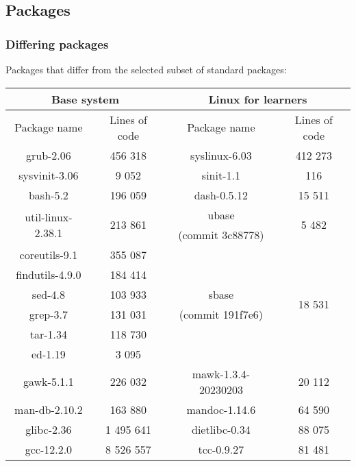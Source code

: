 \subsection{Packages}\label{Packages}

\subsubsection{Differing packages}

Packages that differ from the selected subset of standard packages:

\begin{center}
    \begin{tabular}{|c|c||c|c|}
        \hline
        \multicolumn{2}{|c||}{Base system} & \multicolumn{2}{|c|}{Linux for learners} \\
        \hline
        \hline
        Package name & Lines of code & Package name & Lines of code \\
        \hline
        \hline
        grub-2.06 & 456 318 & syslinux-6.03 & 412 273 \\
        \hline
        sysvinit-3.06 & 9 052 & sinit-1.1 & 116 \\
        \hline
        bash-5.2 & 196 059 & dash-0.5.12 & 15 511 \\
        \hline
        \multirow{2}{*}{util-linux-2.38.1} & \multirow{2}{*}{213 861} & ubase & \multirow{2}{*}{5 482} \\
        & & (commit 3c88778) & \\
        \hline
        coreutils-9.1 & 355 087 & & \multirow{6}{*}{18 531} \\
        findutils-4.9.0 & 184 414 & & \\
        sed-4.8 & 103 933 & sbase & \\
        grep-3.7 & 131 031 & (commit 191f7e6) & \\
        tar-1.34 & 118 730 & & \\
        ed-1.19 & 3 095 & & \\
        \hline
        gawk-5.1.1 & 226 032 & mawk-1.3.4-20230203 & 20 112 \\
        \hline
        man-db-2.10.2 & 163 880 & mandoc-1.14.6 & 64 590 \\
        \hline
        glibc-2.36 & 1 495 641 & dietlibc-0.34 & 88 075 \\
        \hline
        gcc-12.2.0 & 8 526 557 & tcc-0.9.27 & 81 481 \\
        \hline
    \end{tabular}
\end{center}

